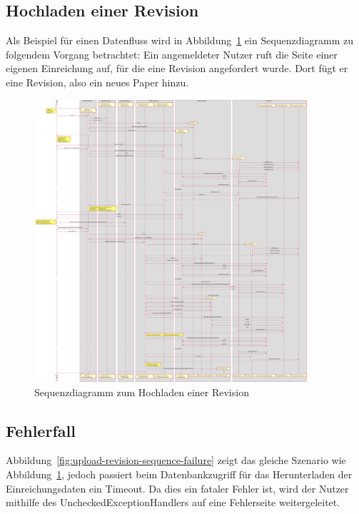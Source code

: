 
\subsection{Hochladen einer Revision}\label{subsec:sequenz-revision-hochladen}

Als Beispiel für einen Datenfluss wird in Abbildung~\ref{fig:upload-revision-sequence} ein Sequenzdiagramm zu folgendem Vorgang betrachtet:
Ein angemeldeter Nutzer ruft die Seite einer eigenen Einreichung auf, für die eine Revision angefordert wurde.
Dort fügt er eine Revision, also ein neues Paper hinzu.

\begin{figure}[H]
    \centering
    \includegraphics[width=0.9\textwidth]{graphics/upload_revision}
    \caption{Sequenzdiagramm zum Hochladen einer Revision}
    \label{fig:upload-revision-sequence}
\end{figure}

\subsection{Fehlerfall}\label{subsec:fehlerfall}

Abbildung~\ref{fig:upload-revision-sequence-failure} zeigt das gleiche Szenario wie Abbildung~\ref{fig:upload-revision-sequence},
jedoch passiert beim Datenbankzugriff für das Herunterladen der Einreichungsdaten ein Timeout.
Da dies ein fataler Fehler ist, wird der Nutzer mithilfe des UncheckedExceptionHandlers auf eine Fehlerseite weitergeleitet.

